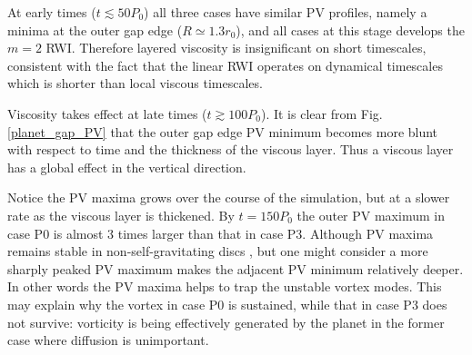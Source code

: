 At early times ($t\lesssim50P_0$) all three cases have similar PV
profiles, namely a minima at the outer gap edge ($R\simeq1.3r_0$), and
all cases at this stage develops the $m=2$ RWI. Therefore layered
viscosity is insignificant on short timescales, consistent with the
fact that the linear RWI operates on dynamical timescales which is
shorter than local viscous timescales. 

Viscosity takes effect at late times ($t\gtrsim100P_0$). It is clear
from Fig. \ref{planet_gap_PV} that the outer gap edge PV minimum
becomes more blunt with respect to time and the thickness of the
viscous layer. Thus a viscous layer has a global effect in the
vertical direction. 

Notice the PV maxima grows over the course of the simulation, but at
a slower rate as the viscous layer is thickened. By $t=150P_0$ the
outer PV maximum in case P0 is almost 3 times larger than that in case
P3. Although PV maxima remains stable in non-self-gravitating
discs \citep{lin11a}, but one might consider a more sharply peaked PV
maximum makes the adjacent PV minimum relatively deeper. In other
words the PV maxima helps to trap the unstable vortex modes. 
This may explain why the vortex in case P0 is sustained, while that in
case P3 does not survive: vorticity is being effectively generated by
the planet in the former case where diffusion is unimportant.  

